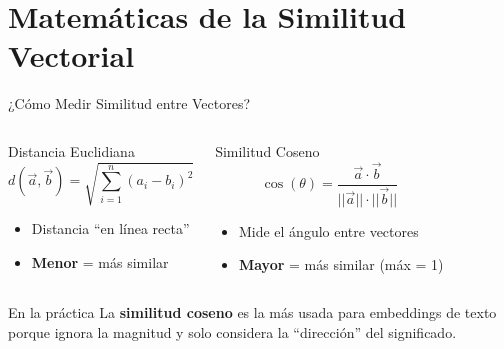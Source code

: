 \documentclass[aspectratio=169]{beamer}
\begin{document}
\section{Matemáticas de la Similitud Vectorial}

\begin{frame}{¿Cómo Medir Similitud entre Vectores?}
    \begin{columns}[t]
        \begin{block}{Distancia Euclidiana}
            \[
            d(\vec{a}, \vec{b}) = \sqrt{\sum_{i=1}^{n}(a_i - b_i)^2}
            \]
            \begin{itemize}
                \item Distancia ``en línea recta''
                \item \textbf{Menor} = más similar
            \end{itemize}
        \end{block}
        
        \begin{block}{Similitud Coseno}
            \[
            \cos(\theta) = \frac{\vec{a} \cdot \vec{b}}{||\vec{a}|| \cdot ||\vec{b}||}
            \]
            \begin{itemize}
                \item Mide el ángulo entre vectores
                \item \textbf{Mayor} = más similar (máx = 1)
            \end{itemize}
        \end{block}
    \end{columns}
    
    \vspace{0.4cm}
    \begin{alertblock}{En la práctica}
        La \textbf{similitud coseno} es la más usada para embeddings de texto porque ignora la magnitud y solo considera la ``dirección'' del significado.
    \end{alertblock}
\end{frame}
\end{document}
